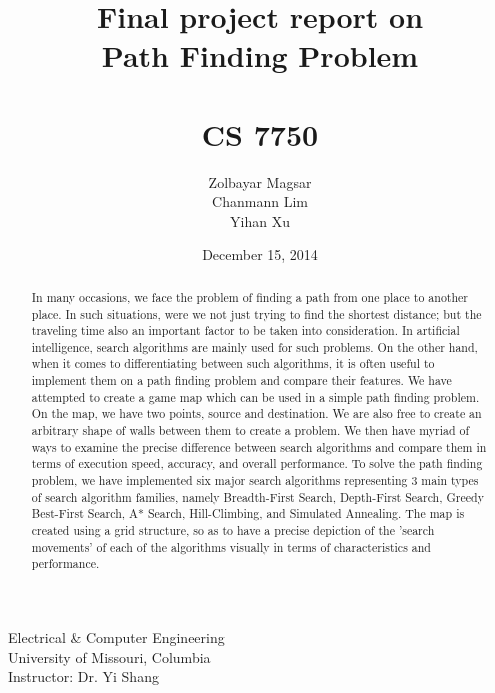 \documentclass[a4paper]{article}
\title{Final project report on \\Path Finding Problem \\~ \\ CS 7750} %
\author{Zolbayar Magsar \\Chanmann Lim \\Yihan Xu}
\date{December 15, 2014}
\begin{document}
\maketitle %

\lstset{language=Java,title=\lstname,basicstyle=\footnotesize}

\begin{center}
Electrical \& Computer Engineering \\
University of Missouri, Columbia \\
\vspace{.5 in}
Instructor: Dr. Yi Shang \\
\end{center}

\vspace{1 in}

\begin{abstract}
In many occasions, we face the problem of finding a path from one place to another place. In such situations, were we not just trying to find the shortest distance; but the traveling time also an important factor to be taken into consideration. In artificial intelligence, search algorithms are mainly used for such problems. On the other hand, when it comes to differentiating between such algorithms, it is often useful to implement them on a path finding problem and compare their features. We have attempted to create a game map which can be used in a simple path finding problem. On the map, we have two points, source and destination. We are also free to create an arbitrary shape of walls between them to create a problem. We then have myriad of ways to examine the precise difference between search algorithms and compare them in terms of execution speed, accuracy, and overall performance. To solve the path finding problem, we have implemented six major search algorithms representing 3 main types of search algorithm families, namely Breadth-First Search, Depth-First Search, Greedy Best-First Search, A* Search, Hill-Climbing, and Simulated Annealing. The map is created using a grid structure, so as to have a precise depiction of the 'search movements' of each of the algorithms visually in terms of characteristics and performance.
\end{abstract}


\end{document}
